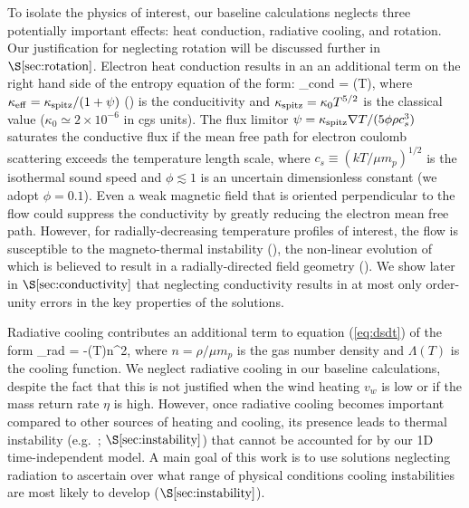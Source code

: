\documentclass[usenatbib,fleqn]{mn2e}
\newcommand{\vwO}{v_{w}}
\begin{document}
To isolate the physics of interest, our baseline calculations neglects three potentially important effects: heat conduction, radiative cooling, and rotation.  Our justification for neglecting rotation will be discussed further in $\S\ref{sec:rotation}$.  Electron heat conduction results in an an additional term on the right hand side of the entropy equation of the form:  
\be {}_{\rm cond} = \nabla\cdot(\kappa \nabla T), \ee
where $\kappa_{\rm
  eff}=\kappa_{\rm spitz}/(1+\psi)$ (\citealt{DaltonBalbus:1993a}) is
the conducitivity and $\kappa_{\rm spitz} = \kappa_0 T^{5/2}$ is the
classical \citet{Spitzer62} value ($\kappa_0\simeq 2\times 10^{-6}$ in
cgs units).  The flux limitor $\psi = \kappa_{\rm spitz} \nabla
T/(5\phi \rho c_s^3)$ saturates the conductive flux if the mean free
path for electron coulomb scattering exceeds the
temperature length scale, where $c_s \equiv (kT/\mu m_p)^{1/2}$ is the
isothermal sound speed and $\phi \lesssim 1$ is an uncertain
dimensionless constant (we adopt $\phi = 0.1$).  Even a weak magnetic
field that is oriented perpendicular to the flow could suppress the
conductivity by greatly reducing the electron mean free path.  However, for radially-decreasing temperature profiles
of interest, the flow is susceptible to the magneto-thermal instability (\citealt{Balbus01}), the non-linear evolution of which is believed to result in a radially-directed field geometry (\citealt{Parrish&Stone07}).  We show later in $\S\ref{sec:conductivity}$ that neglecting conductivity results in at most only order-unity errors in the key properties of the solutions.

Radiative cooling contributes an additional term to equation (\ref{eq:dsdt}) of the form
\be
{}_{\rm rad} = -\Lambda(T)n^{2},
\label{eq:qdot_rad}
\ee
where $n = \rho/\mu m_p$ is the gas number density and $\Lambda(T)$ is the cooling function.  We neglect radiative cooling in our baseline calculations, despite the fact that this is not justified when the wind heating $\vwO$ is low or if the mass return rate $\eta$ is high.  However, once radiative cooling becomes important compared to other sources of heating and cooling, its presence leads to thermal instability (e.g.~\citealt{McCourt+12}; $\S\ref{sec:instability}$) that cannot be accounted for by our 1D
time-independent model.  A main goal of this work is to use solutions neglecting radiation to ascertain over what range of physical conditions cooling instabilities are most likely to develop ($\S\ref{sec:instability}$).
\end{document}

